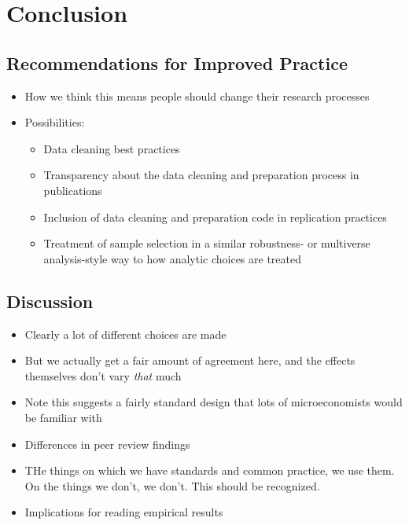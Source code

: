 \documentclass[
  letterpaper,
  DIV=11,
  numbers=noendperiod]{scrartcl}
\begin{document}
\hypertarget{conclusion}{%
\section{Conclusion}\label{conclusion}}

\hypertarget{recommendations-for-improved-practice}{%
\subsection{Recommendations for Improved
Practice}\label{recommendations-for-improved-practice}}

\begin{itemize}
\item
  How we think this means people should change their research processes
\item
  Possibilities:

  \begin{itemize}
  \item
    Data cleaning best practices
  \item
    Transparency about the data cleaning and preparation process in
    publications
  \item
    Inclusion of data cleaning and preparation code in replication
    practices
  \item
    Treatment of sample selection in a similar robustness- or multiverse
    analysis-style way to how analytic choices are treated
  \end{itemize}
\end{itemize}

\hypertarget{discussion}{%
\subsection{Discussion}\label{discussion}}

\begin{itemize}
\item
  Clearly a lot of different choices are made
\item
  But we actually get a fair amount of agreement here, and the effects
  themselves don't vary \emph{that} much
\item
  Note this suggests a fairly standard design that lots of
  microeconomists would be familiar with
\item
  Differences in peer review findings
\item
  THe things on which we have standards and common practice, we use
  them. On the things we don't, we don't. This should be recognized.
\item
  Implications for reading empirical results
\end{itemize}
\end{document}
